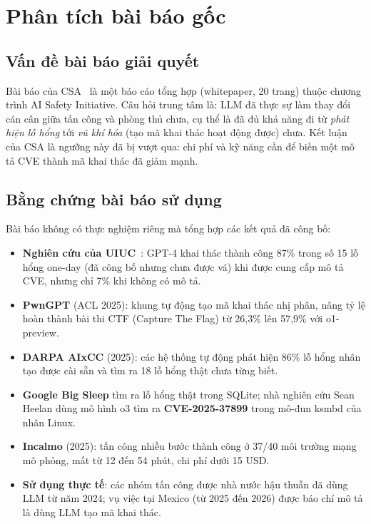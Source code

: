 \documentclass[runningheads]{llncs}
\begin{document}
\section{Phân tích bài báo gốc}\label{sec:baibao}

\subsection{Vấn đề bài báo giải quyết}

Bài báo của CSA~\cite{csa2026} là một báo cáo tổng hợp (whitepaper, 20 trang) thuộc
chương trình AI Safety Initiative. Câu hỏi trung tâm là: LLM đã thực sự làm thay đổi cán
cân giữa tấn công và phòng thủ chưa, cụ thể là đã đủ khả năng đi từ \emph{phát hiện lỗ hổng}
tới \emph{vũ khí hóa} (tạo mã khai thác hoạt động được) chưa. Kết luận của CSA là ngưỡng
này đã bị vượt qua: chi phí và kỹ năng cần để biến một mô tả CVE thành mã khai thác đã
giảm mạnh.

\subsection{Bằng chứng bài báo sử dụng}

Bài báo không có thực nghiệm riêng mà tổng hợp các kết quả đã công bố:
\begin{itemize}
\item \textbf{Nghiên cứu của UIUC}~\cite{fang2024}: GPT-4 khai thác thành công 87\% trong số 15
lỗ hổng one-day (đã công bố nhưng chưa được vá) khi được cung cấp mô tả CVE, nhưng chỉ 7\% khi không có mô tả.
\item \textbf{PwnGPT} (ACL 2025): khung tự động tạo mã khai thác nhị phân, nâng tỷ lệ
hoàn thành bài thi CTF (Capture The Flag) từ 26,3\% lên 57,9\% với o1-preview.
\item \textbf{DARPA AIxCC} (2025): các hệ thống tự động phát hiện 86\% lỗ hổng nhân tạo được cài sẵn và
tìm ra 18 lỗ hổng thật chưa từng biết.
\item \textbf{Google Big Sleep} tìm ra lỗ hổng thật trong SQLite; nhà nghiên cứu Sean Heelan
dùng mô hình o3 tìm ra \textbf{CVE-2025-37899} trong mô-đun ksmbd của nhân Linux.
\item \textbf{Incalmo} (2025): tấn công nhiều bước thành công ở 37/40 môi trường mạng mô phỏng,
mất từ 12 đến 54 phút, chi phí dưới 15 USD.
\item \textbf{Sử dụng thực tế}: các nhóm tấn công được nhà nước hậu thuẫn đã dùng LLM từ năm 2024; vụ việc tại
Mexico (từ 2025 đến 2026) được báo chí mô tả là dùng LLM tạo mã khai thác.
\end{itemize}
\end{document}
